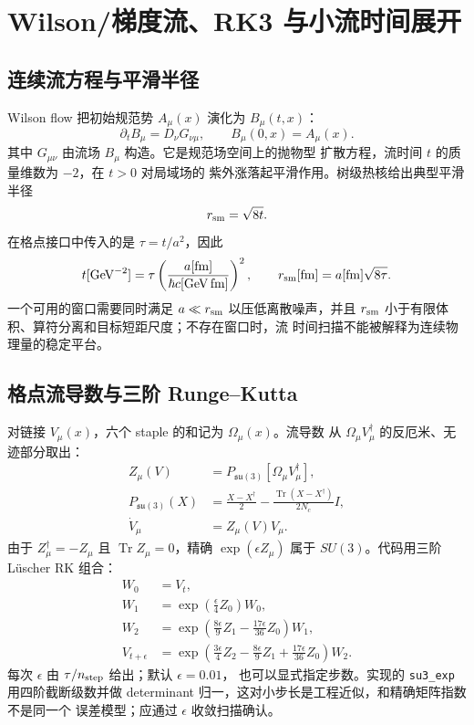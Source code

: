 \documentclass[UTF8,11pt,oneside]{ctexbook}
\begin{document}
\chapter{Wilson/梯度流、RK3 与小流时间展开}
\label{sec:flow}

\section{连续流方程与平滑半径}
Wilson flow 把初始规范势 \(A_\mu(x)\) 演化为 \(B_\mu(t,x)\)：
\begin{equation}
 \partial_tB_\mu=D_\nu G_{\nu\mu},\qquad B_\mu(0,x)=A_\mu(x).
 \label{eq:continuum-flow-clean}
\end{equation}
其中 \(G_{\mu\nu}\) 由流场 \(B_\mu\) 构造。它是规范场空间上的抛物型
扩散方程，流时间 \(t\) 的质量维数为 \(-2\)，在 \(t>0\) 对局域场的
紫外涨落起平滑作用。树级热核给出典型平滑半径
\begin{equation}
 r_{\rm sm}=\sqrt{8t}.
 \label{eq:smoothing-radius-clean}
\end{equation}
在格点接口中传入的是 \(\tau=t/a^2\)，因此
\begin{equation}
 t[\mathrm{GeV}^{-2}]
 =\tau\left(\frac{a[\mathrm{fm}]}{\hbar c[\mathrm{GeV\,fm}]}\right)^2,
 \qquad
 r_{\rm sm}[\mathrm{fm}]=a[\mathrm{fm}]\sqrt{8\tau}.
 \label{eq:flow-conversion-clean}
\end{equation}
一个可用的窗口需要同时满足 \(a\ll r_{\rm sm}\) 以压低离散噪声，并且
\(r_{\rm sm}\) 小于有限体积、算符分离和目标短距尺度；不存在窗口时，流
时间扫描不能被解释为连续物理量的稳定平台。

\section{格点流导数与三阶 Runge--Kutta}
对链接 \(V_\mu(x)\)，六个 staple 的和记为 \(\Omega_\mu(x)\)。流导数
从 \(\Omega_\mu V_\mu^\dagger\) 的反厄米、无迹部分取出：
\begin{align}
 Z_\mu(V)&=P_{\mathfrak{su}(3)}[\Omega_\mu V_\mu^\dagger],\\
 P_{\mathfrak{su}(3)}(X)
 &=\frac{X-X^\dagger}{2}
 -\frac{\operatorname{Tr}(X-X^\dagger)}{2N_c}I,\\
 \dot V_\mu&=Z_\mu(V)V_\mu.
\end{align}
由于 \(Z_\mu^\dagger=-Z_\mu\) 且 \(\operatorname{Tr}Z_\mu=0\)，精确
\(\exp(\epsilon Z_\mu)\) 属于 \(SU(3)\)。代码用三阶 Lüscher RK 组合：
\begin{align}
 W_0&=V_t,\\
 W_1&=\exp\left(\frac{\epsilon}{4}Z_0\right)W_0,\\
 W_2&=\exp\left(\frac{8\epsilon}{9}Z_1-\frac{17\epsilon}{36}Z_0\right)W_1,\\
 V_{t+\epsilon}
 &=\exp\left(\frac{3\epsilon}{4}Z_2-\frac{8\epsilon}{9}Z_1
 +\frac{17\epsilon}{36}Z_0\right)W_2.
 \label{eq:rk3-flow-clean}
\end{align}
每次 \(\epsilon\) 由 \(\tau/n_{\rm step}\) 给出；默认 \(\epsilon=0.01\)，
也可以显式指定步数。实现的 \texttt{su3\_exp} 用四阶截断级数并做
determinant 归一，这对小步长是工程近似，和精确矩阵指数不是同一个
误差模型；应通过 \(\epsilon\) 收敛扫描确认。
\end{document}
